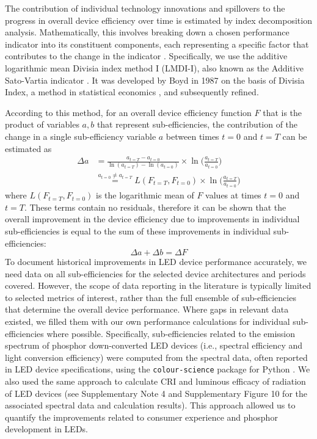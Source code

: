 \documentclass[parskip=full]{article}
\begin{document}
The contribution of individual technology innovations and spillovers to the progress in overall device efficiency over time is estimated by index decomposition analysis. Mathematically, this involves breaking down a chosen performance indicator into its constituent components, each representing a specific factor that contributes to the change in the indicator \cite{Ang1997}. Specifically, we use the additive logarithmic mean Divisia index method I (LMDI-I), also known as the Additive Sato-Vartia indicator \cite{deBoer2019}. It was developed by Boyd in 1987 \cite{Boyd1987} on the basis of Divisia Index, a method in statistical economics \cite{Diewert1988}, and subsequently refined.

According to this method, for an overall device efficiency function $F$ that is the product of variables $a, b$ that represent sub-efficiencies, the contribution of the change in a single sub-efficiency variable $a$ between times $t=0$ and $t=T$ can be estimated as \cite{Ang2019}
%
\begin{align}
    \Delta a &= \frac{a_{t=T} - a_{t=0}}{\ln(a_{t=T}) - \ln(a_{t=0})} \times \ln \big ( \frac{a_{t=T}}{a_{t=0}} \big ) \\
    & \stackrel{a_{t=0} \neq a_{t=T}}{=} L(F_{t=T}, F_{t=0}) \times \ln \big ( \frac{a_{t=T}}{a_{t=0}} \big )
\end{align}
%
where $L(F_{t=T}, F_{t=0})$ is the logarithmic mean of $F$ values at times $t=0$ and $t=T$. These terms contain no residuals, therefore it can be shown that the overall improvement in the device efficiency due to improvements in individual sub-efficiencies is equal to the sum of these improvements in individual sub-efficiencies: 
%
\begin{equation}
    \Delta a + \Delta b  = \Delta F
\end{equation}
%
To document historical improvements in LED device performance accurately, we need data on all sub-efficiencies for the selected device architectures and periods covered. However, the scope of data reporting in the literature is typically limited to selected metrics of interest, rather than the full ensemble of sub-efficiencies that determine the overall device performance. Where gaps in relevant data existed, we filled them with our own performance calculations for individual sub-efficiencies where possible. Specifically, sub-efficiencies related to the emission spectrum of phosphor down-converted LED devices (i.e., spectral efficiency and light conversion efficiency)  were computed from the spectral data, often reported in LED device specifications, using the \texttt{colour-science} package for Python \cite{colour-science_software}. We also used the same approach to calculate CRI and luminous efficacy of radiation of LED devices (see Supplementary Note 4 and Supplementary Figure 10 for the associated spectral data and calculation results). This approach allowed us to quantify the improvements related to consumer experience and phosphor development in LEDs.
\end{document}
